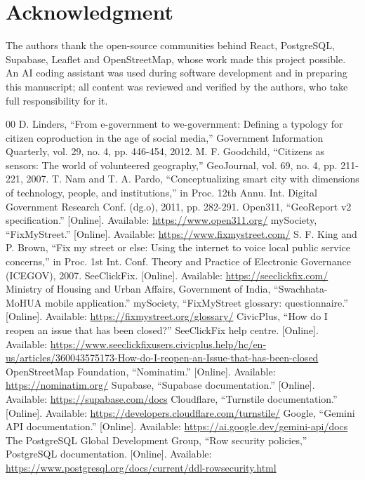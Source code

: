 \documentclass[conference]{IEEEtran}
\begin{document}
\section*{Acknowledgment}
The authors thank the open-source communities behind React, PostgreSQL, Supabase, Leaflet and OpenStreetMap, whose work made this project possible. An AI coding assistant was used during software development and in preparing this manuscript; all content was reviewed and verified by the authors, who take full responsibility for it.
\begin{thebibliography}{00}
 D. Linders, ``From e-government to we-government: Defining a typology for citizen coproduction in the age of social media,'' Government Information Quarterly, vol. 29, no. 4, pp. 446-454, 2012.
 M. F. Goodchild, ``Citizens as sensors: The world of volunteered geography,'' GeoJournal, vol. 69, no. 4, pp. 211-221, 2007.
 T. Nam and T. A. Pardo, ``Conceptualizing smart city with dimensions of technology, people, and institutions,'' in Proc. 12th Annu. Int. Digital Government Research Conf. (dg.o), 2011, pp. 282-291.
 Open311, ``GeoReport v2 specification.'' [Online]. Available: \url{https://www.open311.org/}
 mySociety, ``FixMyStreet.'' [Online]. Available: \url{https://www.fixmystreet.com/}
 S. F. King and P. Brown, ``Fix my street or else: Using the internet to voice local public service concerns,'' in Proc. 1st Int. Conf. Theory and Practice of Electronic Governance (ICEGOV), 2007.
 SeeClickFix. [Online]. Available: \url{https://seeclickfix.com/}
 Ministry of Housing and Urban Affairs, Government of India, ``Swachhata-MoHUA mobile application.''
 mySociety, ``FixMyStreet glossary: questionnaire.'' [Online]. Available: \url{https://fixmystreet.org/glossary/}
 CivicPlus, ``How do I reopen an issue that has been closed?'' SeeClickFix help centre. [Online]. Available: \url{https://www.seeclickfixusers.civicplus.help/hc/en-us/articles/360043575173-How-do-I-reopen-an-Issue-that-has-been-closed}
 OpenStreetMap Foundation, ``Nominatim.'' [Online]. Available: \url{https://nominatim.org/}
 Supabase, ``Supabase documentation.'' [Online]. Available: \url{https://supabase.com/docs}
 Cloudflare, ``Turnstile documentation.'' [Online]. Available: \url{https://developers.cloudflare.com/turnstile/}
 Google, ``Gemini API documentation.'' [Online]. Available: \url{https://ai.google.dev/gemini-api/docs}
 The PostgreSQL Global Development Group, ``Row security policies,'' PostgreSQL documentation. [Online]. Available: \url{https://www.postgresql.org/docs/current/ddl-rowsecurity.html}

\end{thebibliography}
\end{document}
